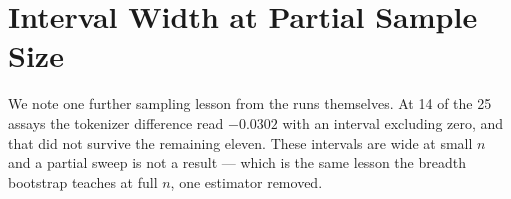 \documentclass[11pt]{article}
\begin{document}
\section{Interval Width at Partial Sample Size}
\label{app:sweep}
We note one further sampling lesson from the runs themselves. At 14 of the 25 assays
the tokenizer difference read $-0.0302$ with an interval excluding zero, and that did
not survive the remaining eleven. These intervals are wide at small $n$ and a partial
sweep is not a result --- which is the same lesson the breadth bootstrap teaches at
full $n$, one estimator removed.
\end{document}
